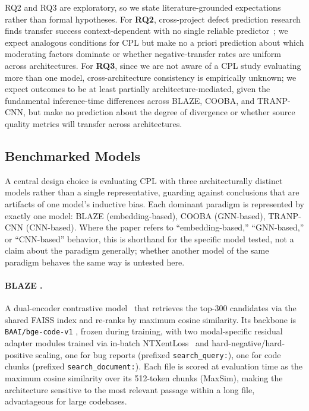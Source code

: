 \documentclass[a4paper,fleqn]{cas-dc}
\begin{document}
RQ2 and RQ3 are exploratory, so we state literature-grounded expectations
rather than formal hypotheses. For \textbf{RQ2}, cross-project defect
prediction research finds transfer success context-dependent with no single
reliable predictor~\citep{hosseini2017systematic}; we expect analogous
conditions for CPL but make no a priori prediction about which moderating
factors dominate or whether negative-transfer rates are uniform across
architectures. For \textbf{RQ3}, since we are not aware of a CPL study
evaluating more than one model, cross-architecture consistency is
empirically unknown; we expect outcomes to be at least partially
architecture-mediated, given the fundamental inference-time differences
across BLAZE, COOBA, and TRANP-CNN, but make no
prediction about the degree of divergence or whether source quality metrics will
transfer across architectures.

\subsection{Benchmarked Models}
\label{sec:models}

A central design choice is evaluating CPL with three architecturally distinct
models rather than a single representative, guarding against conclusions
that are artifacts of one model's inductive bias. Each dominant paradigm is
represented by exactly one model: BLAZE (embedding-based), COOBA (GNN-based),
TRANP-CNN (CNN-based). Where the paper refers to ``embedding-based,''
``GNN-based,'' or ``CNN-based'' behavior, this is shorthand for the specific
model tested, not a claim about the paradigm generally; whether another
model of the same paradigm behaves the same way is untested here.

\paragraph{BLAZE \citep{chakraborty2025blaze}.}
A dual-encoder contrastive model~\citep{reimers2019sentencebert} that
retrieves the top-300 candidates via the shared FAISS index and re-ranks by
maximum cosine similarity. Its backbone is \texttt{BAAI/bge-code-v1}
\citep{bge_code}, frozen during training, with two modal-specific residual
adapter modules trained via in-batch NTXentLoss~\citep{oord2018cpc} and
hard-negative/hard-positive scaling, one for bug reports (prefixed
\texttt{search\_query:}), one for code chunks (prefixed
\texttt{search\_document:}). Each file is scored at evaluation time as the
maximum cosine similarity over its 512-token chunks (MaxSim), making the
architecture sensitive to the most relevant passage within a long file,
advantageous for large codebases.
\end{document}
